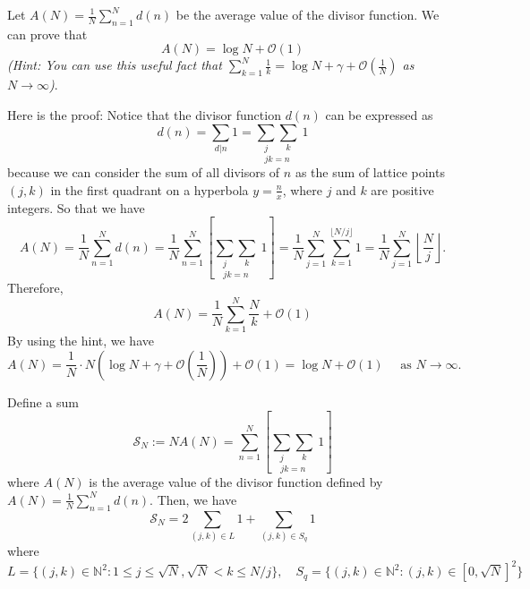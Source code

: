 \documentclass{elegantbook}
\begin{document}
\begin{example}
  Let $A(N) = \frac{1}{N} \sum_{n=1}^{N} d(n)$ be the average value of the divisor function. We can prove that
  \[
    A(N) = \log N + \mathcal{O}(1)
  \]
  \textit{(Hint: You can use this useful fact that \( \sum_{k=1}^N \frac{1}{k} = \log N + \gamma + \mathcal{O}\left( \frac{1}{N} \right) \) as \(N \to \infty\))}.

  Here is the proof: Notice that the divisor function \(d(n)\) can be expressed as
  \[
    d(n) = \sum_{d|n} 1 = \underset{jk=n}{\sum_{j}\sum_{k}}\ 1
  \]
  because we can consider the sum of all divisors of \(n\) as the sum of lattice points \((j,k)\) in the first quadrant on a hyperbola $y = \frac{n}{x}$, where \(j\) and \(k\) are positive integers.
  So that we have
  \[
    A(N) = \frac{1}{N} \sum_{n=1}^{N} d(n) = \frac{1}{N} \sum_{n=1}^{N} \left[\underset{jk=n}{\sum_{j}\sum_{k}}\ 1 \right] = \frac{1}{N} \sum_{j=1}^{N} \sum_{k=1}^{\lfloor N/j \rfloor} 1 = \frac{1}{N} \sum_{j=1}^{N} \left\lfloor \frac{N}{j} \right\rfloor.
  \]
  Therefore, 
  \[
    A(N) = \frac{1}{N} \sum_{k=1}^{N} \frac{N}{k} + \mathcal{O}(1)
  \]
  By using the hint, we have
  \[
    A(N) = \frac{1}{N} \cdot N \left( \log N + \gamma + \mathcal{O}\left( \frac{1}{N} \right) \right) + \mathcal{O}(1) = \log N + \mathcal{O}(1) \quad \text{ as } N \to \infty.
  \]
\end{example}

\begin{theorem} \label{thm:lattice_point_count_for_divisor_function}
  Define a sum
  \[
    \mathcal{S}_N := N A(N) = \sum_{n=1}^{N} \left[\underset{jk=n}{\sum_{j}\sum_{k}}\ 1 \right]
  \]
  where \(A(N)\) is the average value of the divisor function defined by \(A(N) = \frac{1}{N} \sum_{n=1}^{N} d(n)\). Then, we have
  \[
    \mathcal{S}_N = 2 \sum_{(j,k)\in L} 1 + \sum_{(j,k) \in S_q} 1
  \]
  where
  \[
    L = \{ (j,k)\in \mathbb{N}^2 : 1 \leq j \leq \sqrt{N}, \sqrt{N} < k \leq N/j \}, \quad S_q = \{ (j,k)\in \mathbb{N}^2 : (j,k) \in [0,\sqrt{N}]^2\}
  \]
\end{theorem}
\end{document}
